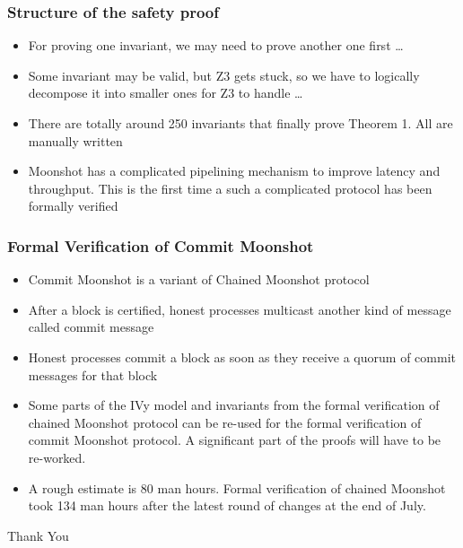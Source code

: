 \documentclass{beamer}
\begin{document}
\begin{frame}
    \frametitle{Structure of the safety proof}
    \begin{itemize}
        \item For proving one invariant, we may need to prove another
            one first \dots
            \pause
            \vfill
        \item Some invariant may be valid, but Z3 gets stuck, so we
            have to logically decompose it into smaller ones for Z3 to
            handle \dots
            \pause
            \vfill
        \item There are totally around 250 invariants that finally
            prove Theorem 1. All are manually written
            \pause
            \vfill
        \item Moonshot has a complicated pipelining mechanism to
            improve latency and throughput. This is the first time a
            such a complicated protocol has been formally verified
    \end{itemize}
\end{frame}
\begin{frame}
    \frametitle{Formal Verification of Commit Moonshot}
    \begin{itemize}
        \item Commit Moonshot is a variant of Chained Moonshot
            protocol
            \pause
            \vfill
        \item After a block is certified, honest processes multicast
            another kind of message called commit message
            \pause
            \vfill
        \item Honest processes commit a block as soon as they receive
            a quorum of commit messages for that block
            \pause
            \vfill
        \item Some parts of the IVy model and invariants from the
            formal verification of chained Moonshot protocol can be
            re-used for the formal verification of commit Moonshot
            protocol. A significant part of the proofs will have to be
            re-worked.
            \pause
            \vfill
        \item A rough estimate is 80 man hours. Formal verification of
            chained Moonshot took 134 man hours after the latest
            round of changes at the end of July.
    \end{itemize}
    \pause
    \vfill
    \begin{center}
        \Large{Thank You}
    \end{center}
\end{frame}
\end{document}
